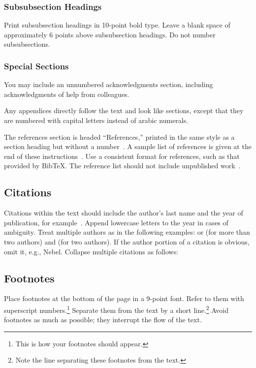\documentclass{article}
\begin{document}
\subsubsection{Subsubsection Headings}

Print subsubsection headings in 10-point bold type. Leave a blank
space of approximately 6 points above subsubsection headings. Do not
number subsubsections.

\subsubsection{Special Sections}

You may include an unnumbered acknowledgments section, including
acknowledgments of help from colleagues.

Any appendices directly follow the text and look like sections, except
that they are numbered with capital letters instead of arabic
numerals.

The references section is headed ``References,'' printed in the same
style as a section heading but without a number~\cite{russell-norvig:Modern}. A sample list of
references is given at the end of these instructions~\cite{rupeneite:Reinforcement}. Use a consistent
format for references, such as that provided by Bib\TeX{}. The reference
list should not include unpublished work~\cite{trc:hs}.

\subsection{Citations}

Citations within the text should include the author's last name and
the year of publication, for example~\cite{trc:ars}.  Append
lowercase letters to the year in cases of ambiguity.  Treat multiple
authors as in the following examples:
or (for more than two authors) and (for two authors).  If the author
portion of a citation is obvious, omit it, e.g.,
Nebel.  Collapse multiple citations as
follows:
~\cite{trc:ars}
~\cite{trc:hs}
~\cite{rupeneite:Reinforcement}
~\cite{russell-norvig:Modern}
~\cite{sqas:replay}

\subsection{Footnotes}

Place footnotes at the bottom of the page in a 9-point font.  Refer to
them with superscript numbers.\footnote{This is how your footnotes
should appear.} Separate them from the text by a short
line.\footnote{Note the line separating these footnotes from the
text.} Avoid footnotes as much as possible; they interrupt the flow of
the text.
\end{document}
